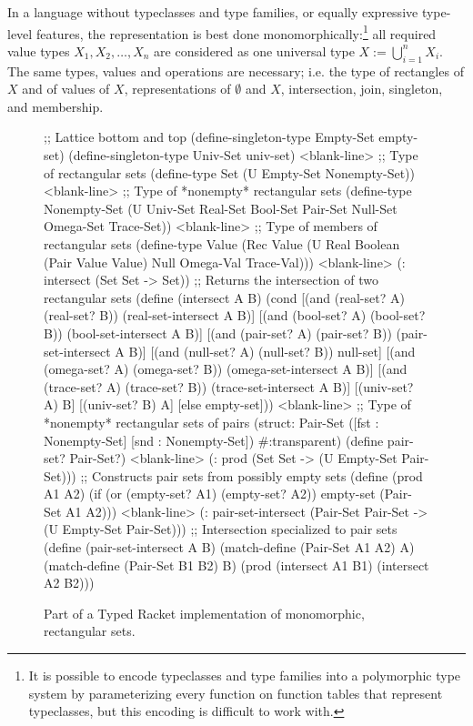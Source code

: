 In a language without typeclasses and type families, or equally expressive type-level features, the representation is best done monomorphically:\footnote{It is possible to encode typeclasses and type families into a polymorphic type system by parameterizing every function on function tables that represent typeclasses, but this encoding is difficult to work with.} all required value types $X_1, X_2, \dots, X_n$ are considered as one universal type $X := \bigcup_{i = 1}^n X_i$.
The same types, values and operations are necessary; i.e. the type of rectangles of $X$ and of values of $X$, representations of $\emptyset$ and $X$, intersection, join, singleton, and membership.

\begin{figure}[p!]\centering
\begin{schemedisplay}
;; Lattice bottom and top
(define-singleton-type Empty-Set empty-set)
(define-singleton-type Univ-Set univ-set)
<blank-line>
;; Type of rectangular sets
(define-type Set (U Empty-Set Nonempty-Set))
<blank-line>
;; Type of *nonempty* rectangular sets
(define-type Nonempty-Set
  (U Univ-Set Real-Set Bool-Set Pair-Set Null-Set Omega-Set Trace-Set))
<blank-line>
;; Type of members of rectangular sets
(define-type Value
  (Rec Value (U Real Boolean (Pair Value Value) Null Omega-Val Trace-Val)))
<blank-line>
(: intersect (Set Set -> Set))
;; Returns the intersection of two rectangular sets
(define (intersect A B)
  (cond [(and (real-set? A) (real-set? B))  (real-set-intersect A B)]
        [(and (bool-set? A) (bool-set? B))  (bool-set-intersect A B)]
        [(and (pair-set? A) (pair-set? B))  (pair-set-intersect A B)]
        [(and (null-set? A) (null-set? B))  null-set]
        [(and (omega-set? A) (omega-set? B))  (omega-set-intersect A B)]
        [(and (trace-set? A) (trace-set? B))  (trace-set-intersect A B)]
        [(univ-set? A)  B]
        [(univ-set? B)  A]
        [else  empty-set]))
<blank-line>
;; Type of *nonempty* rectangular sets of pairs
(struct: Pair-Set ([fst : Nonempty-Set] [snd : Nonempty-Set])
  #:transparent)
(define pair-set? Pair-Set?)
<blank-line>
(: prod (Set Set -> (U Empty-Set Pair-Set)))
;; Constructs pair sets from possibly empty sets
(define (prod A1 A2)
  (if (or (empty-set? A1) (empty-set? A2))
      empty-set
      (Pair-Set A1 A2)))
<blank-line>
(: pair-set-intersect (Pair-Set Pair-Set -> (U Empty-Set Pair-Set)))
;; Intersection specialized to pair sets
(define (pair-set-intersect A B)
  (match-define (Pair-Set A1 A2) A)
  (match-define (Pair-Set B1 B2) B)
  (prod (intersect A1 B1) (intersect A2 B2)))
\end{schemedisplay}
\bottomhrule
\caption[Typed Racket implementation of rectangular sets]{Part of a Typed Racket implementation of monomorphic, rectangular sets.}
\label{fig:typed-racket-set}
\end{figure}

